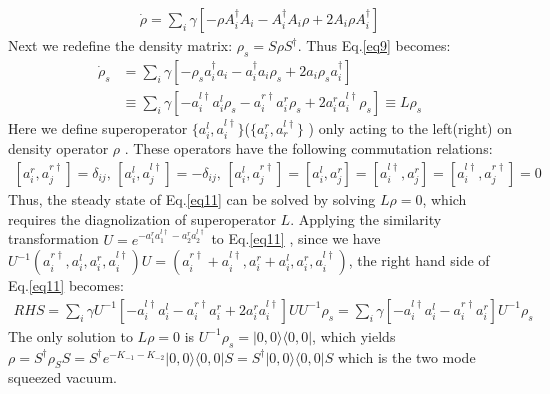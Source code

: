 \documentclass[aps,showpacs,onecolumn,twoside,groupedaddress]{revtex4}
\begin{document}
\begin{equation}
\label{eq9}
\begin{split}
\dot{\rho}=\sum_{i}\gamma[-\rho A_{i}^{\dagger}A_{i}-A_{i}^{\dagger}A_{i}\rho+2A_{i}\rho A_{i}^{\dagger}]
\end{split}
\end{equation}
Next we redefine the density matrix: $\rho_{s}=S\rho S^{\dagger}$. Thus Eq.\eqref{eq9} becomes:
\begin{equation}
\label{eq11}
\begin{split}
\dot{\rho}_{s}&=\sum_{i}\gamma[-\rho_{s}a_{i}^{\dagger}a_{i}-a_{i}^{\dagger}a_{i}\rho_{s}+2a_{i}\rho_{s}a_{i}^{\dagger}]\\
&\equiv\sum_{i}\gamma[-a_{i}^{l\dagger}a_{i}^{l}\rho_{s}-a_{i}^{r\dagger}a_{i}^{r}\rho_{s}+2a_{i}^{r}a_{i}^{l\dagger}\rho_{s}]\equiv L\rho_{s}
\end{split}
\end{equation}
Here we define superoperator $\{a_{i}^{l}, a_{i}^{l\dagger}\}$($\{a_{i}^{r}, a_{r}^{l\dagger}\}$ ) only acting to the left(right) on density operator $\rho$ \cite{Wang2002, An}. These operators have the following commutation relations: 
\begin{equation}
\label{eq12}
\begin{split}
[a_{i}^{r},a_{j}^{r\dagger}]=\delta_{ij},\,[a_{i}^{l},a_{j}^{l\dagger}]=-\delta_{ij},\,[a_{i}^{l},a_{j}^{r\dagger}]=[a_{i}^{l},a_{j}^{r}]=[a_{i}^{l\dagger},a_{j}^{r}]=[a_{i}^{l\dagger},a_{j}^{r\dagger}]=0
\end{split}
\end{equation}
Thus, the steady state of Eq.\eqref{eq11} can be solved by solving $L\rho=0$, which requires the diagnolization of superoperator $L$. Applying the similarity transformation $U=e^{-a_{1}^{r}a_{1}^{l\dagger}-a_{2}^{r}a_{2}^{l\dagger}}$ to Eq.\eqref{eq11} , since we have $U^{-1}(a_{i}^{r\dagger},a_{i}^{l},a_{i}^{r},a_{i}^{l\dagger})U=(a_{i}^{r\dagger}+a_{i}^{l\dagger},a_{i}^{r}+a_{i}^{l},a_{i}^{r},a_{i}^{l\dagger})$, the right hand side of Eq.\eqref{eq11} becomes:
\begin{equation}
\label{eq13}
\begin{split}
RHS=\sum_{i}\gamma U^{-1}[-a_{i}^{l\dagger}a_{i}^{l}-a_{i}^{r\dagger}a_{i}^{r}+2a_{i}^{r}a_{i}^{l\dagger}]UU^{-1}\rho_{s}=\sum_{i}\gamma[-a_{i}^{l\dagger}a_{i}^{l}-a_{i}^{r\dagger}a_{i}^{r}]U^{-1}\rho_{s}
\end{split}
\end{equation}
The only solution to $L\rho=0$ is $U^{-1}\rho_{s}=|0,0\rangle\langle0,0|$, which yields $\rho=S^{\dagger}\rho_S S=S^{\dagger}e^{-K_{-1}-K_{-2}}|0,0\rangle\langle0,0|S=S^{\dagger}|0,0\rangle\langle0,0|S$ which is the two mode squeezed vacuum.
\end{document}
